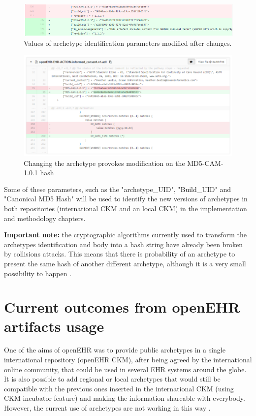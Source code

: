 \documentclass[mim_thesis.tex]{subfiles}
\begin{document}
\begin{figure}[H]
	\centering
  \includegraphics[width=1\textwidth]{img/compare_arch_versions.PNG}
	\caption{Values of archetype identification parameters modified after changes.}
	\label{fig:compare_arch_versions.PNG}
\end{figure}

\begin{figure}[H]
	\centering
  \includegraphics[width=1\textwidth]{img/MD5_hash_diff.PNG}
	\caption{Changing the archetype provokes modification on the MD5-CAM-1.0.1 hash}
	\label{fig:MD5_hash_diff}
\end{figure}

Some of these parameters, such as the "archetype\_UID", "Build\_UID" and "Canonical MD5 Hash" will be used to identify the new versions of archetypes in both repositories (international CKM and an local CKM) in the implementation and methodology chapters.


\textbf{Important note:} the cryptographic algorithms currently used to transform the archetypes identification and body into a hash string have already been broken by collisions attacks. This means that there is probability of an archetype to present the same hash of another different archetype, although it is a very small possibility to happen \citep{Selinger2006}.


\section{Current outcomes from openEHR artifacts usage}
One of the aims of openEHR was to provide public archetypes in a single 
international repository (openEHR CKM), after being agreed by the international 
online community, that could be used in several EHR systems around the globe. It 
is also possible to add regional or local archetypes that would still be compatible with the previous ones inserted in the international CKM (using CKM incubator feature) and making the information shareable with everybody. However, the current use of archetypes are not working in this way \citep{Grieve2016vid}.\\
\end{document}
